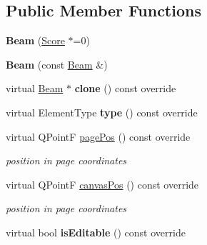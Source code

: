 \subsection*{Public Member Functions}
\begin{DoxyCompactItemize}
\item 
\mbox{\label{class_ms_1_1_beam_a90831c2243cc7c12ecead497fbc89ca4}} 
{\bfseries Beam} (\hyperlink{class_ms_1_1_score}{Score} $\ast$=0)
\item 
\mbox{\label{class_ms_1_1_beam_a694e2522849ee17aa3657a984e2824d6}} 
{\bfseries Beam} (const \hyperlink{class_ms_1_1_beam}{Beam} \&)
\item 
\mbox{\label{class_ms_1_1_beam_a39ed4941b20584c5e471ac26d3b9c4cd}} 
virtual \hyperlink{class_ms_1_1_beam}{Beam} $\ast$ {\bfseries clone} () const override
\item 
\mbox{\label{class_ms_1_1_beam_af5036ee03ecd8de36ce54b5cc89b6c05}} 
virtual Element\+Type {\bfseries type} () const override
\item 
\mbox{\label{class_ms_1_1_beam_a07d57f751873b5932fa83dda4594fab8}} 
virtual Q\+PointF \hyperlink{class_ms_1_1_beam_a07d57f751873b5932fa83dda4594fab8}{page\+Pos} () const override
\begin{DoxyCompactList}\small\item\em position in page coordinates \end{DoxyCompactList}\item 
\mbox{\label{class_ms_1_1_beam_ae4d569a1536fd18f7b23ea12ad8f7990}} 
virtual Q\+PointF \hyperlink{class_ms_1_1_beam_ae4d569a1536fd18f7b23ea12ad8f7990}{canvas\+Pos} () const override
\begin{DoxyCompactList}\small\item\em position in page coordinates \end{DoxyCompactList}\item 
\mbox{\label{class_ms_1_1_beam_abff9c07b034b1273729aaf8fea5788f4}} 
virtual bool {\bfseries is\+Editable} () const override
\item 
\mbox{\label{class_ms_1_1_beam_afd2052dae855c3b104ee2b3cce23c7ef}} 

\end{DoxyCompactItemize}
